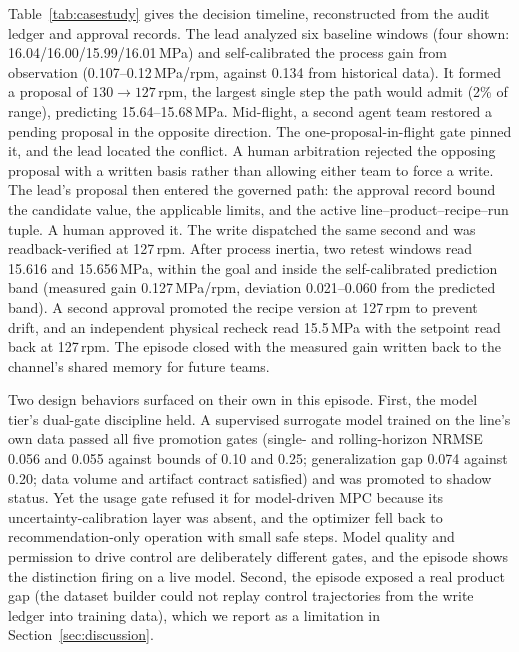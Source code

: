 Table~\ref{tab:casestudy} gives the decision timeline, reconstructed
from the audit ledger and approval records. The lead analyzed six
baseline windows (four shown: 16.04/16.00/15.99/16.01\,MPa) and
self-calibrated the process gain from observation (0.107--0.12\,MPa/rpm,
against 0.134 from historical data). It formed a proposal of
$130 \to 127$\,rpm, the largest single step the path would admit
(2\% of range), predicting 15.64--15.68\,MPa. Mid-flight, a second agent team restored a pending
proposal in the opposite direction. The one-proposal-in-flight gate
pinned it, and the lead located the conflict. A human arbitration
rejected the opposing proposal with a written basis rather than allowing
either team to force a write. The lead's proposal then entered the
governed path: the approval record bound the candidate value, the
applicable limits, and the active line--product--recipe--run tuple. A
human approved it. The write dispatched the same second and was
readback-verified at 127\,rpm. After process inertia, two retest windows
read 15.616 and 15.656\,MPa, within the goal and inside the
self-calibrated prediction band (measured gain 0.127\,MPa/rpm,
deviation 0.021--0.060 from the predicted band). A second approval
promoted the recipe version at 127\,rpm to prevent drift, and an
independent physical recheck read 15.5\,MPa with the setpoint read back
at 127\,rpm. The episode closed with the measured gain written back to
the channel's shared memory for future teams.

Two design behaviors surfaced on their own in this episode. First, the
model tier's dual-gate discipline held. A supervised surrogate model
trained on the line's own data passed all five promotion gates (single-
and rolling-horizon NRMSE 0.056 and 0.055 against bounds of 0.10 and
0.25; generalization gap 0.074 against 0.20; data volume and artifact
contract satisfied) and was promoted to shadow status. Yet the usage
gate refused it for model-driven MPC because its uncertainty-calibration
layer was absent, and the optimizer fell back to recommendation-only
operation with small safe steps. Model quality and permission to drive
control are deliberately different gates, and the episode shows the
distinction firing on a live model. Second, the episode exposed a real
product gap (the dataset builder could not replay control trajectories
from the write ledger into training data), which we report as a
limitation in Section~\ref{sec:discussion}.

